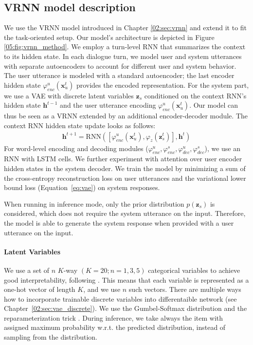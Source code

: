 \subsection{VRNN model description}
We use the VRNN model introduced in Chapter \ref{02:sec:vrnn} and extend it to fit the task-oriented setup.
Our model's architecture is depicted in Figure \ref{05:fig:vrnn_method}.
We employ a turn-level RNN that summarizes the context to its hidden state.
In each dialogue turn, we model user and system utterances with separate autoencoders to account for different user and system behavior.
The user utterance is modeled with a standard autoencoder; the last encoder hidden state $\varphi^u_{enc}(\mathbf{x}^t_u)$ provides the encoded representation.
For the system part, we use a VAE with discrete latent variables $\textbf{z}_s$ conditioned on the context RNN's hidden state $\mathbf{h}^{t-1}$ and the user utterance encoding $\varphi^u_{enc}(\mathbf{x}^t_u)$.
Our model can thus be seen as a VRNN extended by an additional encoder-decoder module.
The context RNN hidden state update looks as follows:
\begin{equation}
    \begin{gathered}
        \mathbf{h}^{t+1} = \text{RNN}([\varphi^u_{enc}(\mathbf{x}_u^t),\varphi_{z}(\mathbf{z}^t_s)], \mathbf{h}^t)
    \end{gathered}
\end{equation}
For word-level encoding and decoding modules ($\varphi_{enc}^u,\varphi_{enc}^s,\varphi_{dec}^u,\varphi_{dec}^s$), we use an RNN with LSTM cells.
We further experiment with attention \cite{bahdanau2014neural} over user encoder hidden states in the system decoder.
We train the model by minimizing a sum of the cross-entropy reconstruction loss on user utterances and the variational lower bound loss (Equation~\ref{eq:vae}) on system responses.

When running in inference mode, only the prior distribution $p(\mathbf{z}_s)$ is considered, which does not require the system utterance on the input.
Therefore, the model is able to generate the system response when provided with a user utterance on the input.

\paragraph{Latent Variables}
\label{05:sec:method_latent}
We use a set of $n$ \mbox{$K$-way} $(K=20;n=1,3,5)$ categorical variables to achieve good interpretability, following \citet{zhao2018unsupervised}.
This means that each variable is represented as a one-hot vector of length $K$, and we use $n$ such vectors.
There are multiple ways how to incorporate trainable discrete variables into differentaible network (see Chapter~\ref{02:sec:vae_discrete}).
We use the Gumbel-Softmax distribution and the reparameterization trick \cite{jang2017categorical}.
During inference, we take always the item with assigned maximum probability w.r.t. the predicted distribution, instead of sampling from the distribution.

